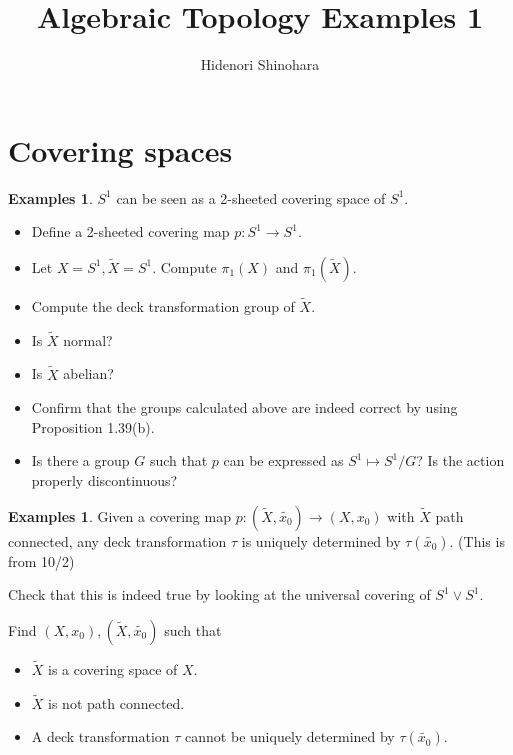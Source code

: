 \documentclass[12pt, psamsfonts]{amsart}
\theoremstyle{definition}
\newtheorem{exmps}[thm]{Examples}
\theoremstyle{remark}
\numberwithin{equation}{section}
\begin{document}
\title{Algebraic Topology Examples 1}
\author{Hidenori Shinohara}
\maketitle

\section{Covering spaces}

\begin{exmps}
  $S^1$ can be seen as a 2-sheeted covering space of $S^1$.
  \begin{itemize}
    \item
      Define a 2-sheeted covering map $p: S^1 \rightarrow S^1$.
    \item
      Let $X = S^1, \tilde{X} = S^1$.
      Compute $\pi_1(X)$ and $\pi_1(\tilde{X})$.
    \item
      Compute the deck transformation group of $\tilde{X}$.
    \item
      Is $\tilde{X}$ normal?
    \item
      Is $\tilde{X}$ abelian?
    \item
      Confirm that the groups calculated above are indeed correct by using Proposition 1.39(b). 
    \item
      Is there a group $G$ such that $p$ can be expressed as $S^1 \mapsto S^1 / G$?
      Is the action properly discontinuous?
  \end{itemize}
\end{exmps}

\begin{exmps}
  Given a covering map $p: (\tilde{X}, \tilde{x_0}) \rightarrow (X, x_0)$ with $\tilde{X}$ path connected, any deck transformation $\tau$ is uniquely determined by $\tau(\tilde{x_0})$.
  (This is from 10/2)

  Check that this is indeed true by looking at the universal covering of $S^1 \vee S^1$.

  Find $(X, x_0), (\tilde{X}, \tilde{x_0})$ such that
  \begin{itemize}
    \item
      $\tilde{X}$ is a covering space of $X$.
    \item
      $\tilde{X}$ is not path connected.
    \item
      A deck transformation $\tau$ cannot be uniquely determined by $\tau(\tilde{x_0})$.
  \end{itemize}
\end{exmps}
\end{document}
